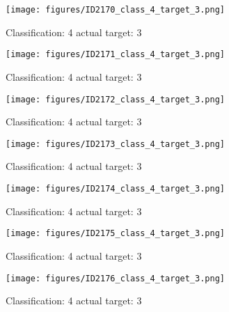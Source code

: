 \begin{figure}[h!]
\begin{center}
\texttt{[image: figures/ID2170\_class\_4\_target\_3.png]}
\end{center}
\caption{ Classification: 4 actual target: 3}
\label{fig:ID2170_class_4_target_3}
\end{figure}
\begin{figure}[h!]
\begin{center}
\texttt{[image: figures/ID2171\_class\_4\_target\_3.png]}
\end{center}
\caption{ Classification: 4 actual target: 3}
\label{fig:ID2171_class_4_target_3}
\end{figure}
\begin{figure}[h!]
\begin{center}
\texttt{[image: figures/ID2172\_class\_4\_target\_3.png]}
\end{center}
\caption{ Classification: 4 actual target: 3}
\label{fig:ID2172_class_4_target_3}
\end{figure}
\begin{figure}[h!]
\begin{center}
\texttt{[image: figures/ID2173\_class\_4\_target\_3.png]}
\end{center}
\caption{ Classification: 4 actual target: 3}
\label{fig:ID2173_class_4_target_3}
\end{figure}
\begin{figure}[h!]
\begin{center}
\texttt{[image: figures/ID2174\_class\_4\_target\_3.png]}
\end{center}
\caption{ Classification: 4 actual target: 3}
\label{fig:ID2174_class_4_target_3}
\end{figure}
\begin{figure}[h!]
\begin{center}
\texttt{[image: figures/ID2175\_class\_4\_target\_3.png]}
\end{center}
\caption{ Classification: 4 actual target: 3}
\label{fig:ID2175_class_4_target_3}
\end{figure}
\begin{figure}[h!]
\begin{center}
\texttt{[image: figures/ID2176\_class\_4\_target\_3.png]}
\end{center}
\caption{ Classification: 4 actual target: 3}
\label{fig:ID2176_class_4_target_3}
\end{figure}
